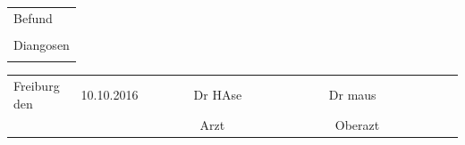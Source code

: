 \documentclass{scrreprt}
\begin{document}
\begin{center}
\setlength{\tabcolsep}{0em}
\begin{longtable}{p{\linewidth}}
	\Large  Befund \\*
	\begin{addmargin}{0.2cm}
		\normalsize \lipsum[2-4] 
	\end{addmargin}\\
	\Large Diangosen \\*
	\begin{addmargin}{0.2cm}
		\normalsize \lipsum[2-4] 
	\end{addmargin} 
\end{longtable}
\end{center}

\begin{center}
\begin{tabular}{p{0.15\linewidth}p{0.25\linewidth}p{0.3\linewidth}p{0.3\linewidth}}
	Freiburg den & 10.10.2016 & Dr HAse & Dr maus \\
	~ & ~ &  ~Arzt & ~Oberazt
\end{tabular}
\end{center}
\end{document}
